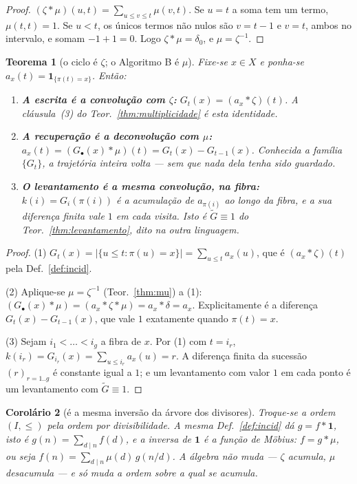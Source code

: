\documentclass[11pt,a4paper]{article}
\newtheorem{teorema}{Teorema}
\newtheorem{corolario}[teorema]{Corolário}
\begin{document}
\begin{proof}
$(\zeta*\mu)(u,t)=\sum_{u\le v\le t}\mu(v,t)$. Se $u=t$ a soma tem um termo,
$\mu(t,t)=1$. Se $u<t$, os únicos termos não nulos são $v=t-1$ e $v=t$, ambos no
intervalo, e somam $-1+1=0$. Logo $\zeta*\mu=\delta_0$, e $\mu=\zeta^{-1}$.
\end{proof}

\begin{teorema}[o ciclo é $\zeta$; o Algoritmo B é $\mu$]\label{thm:zeta-mu}
Fixe-se $x\in X$ e ponha-se $a_x(t)=\mathbf{1}_{\{\pi(t)=x\}}$. Então:
\begin{enumerate}\itemsep3pt
\item[(1)] \textbf{A escrita é a convolução com $\zeta$:}
      $G_t(x)=(a_x*\zeta)(t)$. A cláusula~(3) do
      Teor.~\ref{thm:multiplicidade} \emph{é} esta identidade.
\item[(2)] \textbf{A recuperação é a deconvolução com $\mu$:}
      $a_x(t)=(G_\bullet(x)*\mu)(t)=G_t(x)-G_{t-1}(x)$. Conhecida a família
      $\{G_t\}$, a trajetória inteira volta --- sem que nada dela tenha sido
      guardado.
\item[(3)] \textbf{O levantamento é a mesma convolução, na fibra:}
      $k(i)=G_i(\pi(i))$ é a acumulação de $a_{\pi(i)}$ ao longo da fibra, e a
      sua diferença finita vale $1$ em cada visita. Isto \emph{é}
      $\tilde G\equiv1$ do Teor.~\ref{thm:levantamento}, dito na outra
      linguagem.
\end{enumerate}
\end{teorema}

\begin{proof}
(1) $G_t(x)=\lvert\{u\le t:\pi(u)=x\}\rvert=\sum_{u\le t}a_x(u)$, que é
$(a_x*\zeta)(t)$ pela Def.~\ref{def:incid}.

(2) Aplique-se $\mu=\zeta^{-1}$ (Teor.~\ref{thm:mu}) a (1):
$(G_\bullet(x)*\mu)=(a_x*\zeta*\mu)=a_x*\delta=a_x$. Explicitamente é a
diferença $G_t(x)-G_{t-1}(x)$, que vale $1$ exatamente quando $\pi(t)=x$.

(3) Sejam $i_1<\dots<i_g$ a fibra de $x$. Por (1) com $t=i_r$,
$k(i_r)=G_{i_r}(x)=\sum_{u\le i_r}a_x(u)=r$. A diferença finita da sucessão
$(r)_{r=1..g}$ é constante igual a $1$; e um levantamento com valor $1$ em cada
ponto é um levantamento com $\tilde G\equiv1$.
\end{proof}

\begin{corolario}[é a mesma inversão da árvore dos divisores]\label{cor:mobius}
Troque-se a ordem $(I,\le)$ pela ordem por \emph{divisibilidade}. A mesma
Def.~\ref{def:incid} dá $g=f*\mathbf{1}$, isto é
$g(n)=\sum_{d\mid n}f(d)$, e a inversa de $\mathbf{1}$ é a função de Möbius:
$f=g*\mu$, ou seja $f(n)=\sum_{d\mid n}\mu(d)\,g(n/d)$. A álgebra não muda ---
$\zeta$ acumula, $\mu$ desacumula --- e só muda a ordem sobre a qual se acumula.
\end{corolario}
\end{document}
